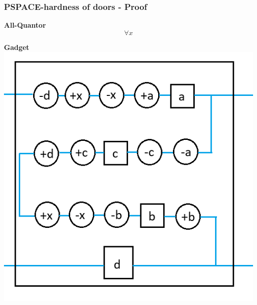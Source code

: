 \documentclass{beamer}
\begin{document}
\begin{frame}
  \frametitle{PSPACE-hardness of doors - Proof}
  \begin{minipage}[t]{0.45\textwidth}
    \textbf{All-Quantor}
    \[ \forall x \]
  \end{minipage}
  \begin{minipage}[t]{0.45\textwidth}
    \textbf{Gadget}
    \includegraphics[width=1.3\textwidth]{res/AllGadget.png}
  \end{minipage}
\end{frame}
\end{document}

